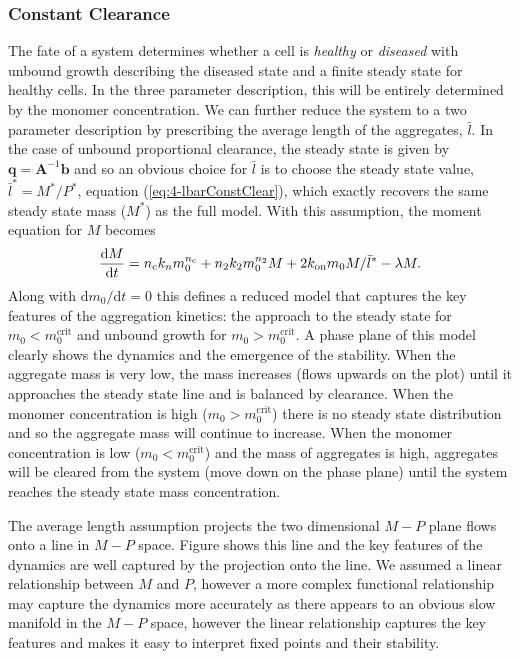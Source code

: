 \subsubsection{Constant Clearance}

The fate of a system determines whether a cell is \textit{healthy} or \textit{diseased} with unbound growth describing the diseased state and a finite steady state for healthy cells. In the three parameter description, this will be entirely determined by the monomer concentration. We can further reduce the system to a two parameter description by prescribing the average length of the aggregates, $\bar{l}$. In the case of unbound proportional clearance, the steady state is given by $\mathbf{q}=\mathbf{A}^{-1}\mathbf{b}$ and so an obvious choice for $\bar{l}$ is to choose the steady state value, $\bar{l}^*=M^*/P^*$, equation (\ref{eq:4-lbarConstClear}), which exactly recovers the same steady state mass ($M^*$) as the full model. With this assumption, the moment equation for $M$ becomes
\begin{equation}
    \frac{\text{d}M}{\text{d}t}= n_{\mathrm{c}} k_n m_0^{n_{\mathrm{c}}} + n_2 k_2 m_0^{n_2} M + 2 k_\text{on} m_0 M/\bar{l}^* - \lambda M.
    \label{eq:4-reducedConstClear}
\end{equation}
Along with $\text{d}m_0/\text{d}t=0$ this defines a reduced model that captures the key features of the aggregation kinetics: the approach to the steady state for $m_0 < m_0^{\text{crit}}$ and unbound growth for $m_0 > m_0^{\text{crit}}$. A phase plane of this model clearly shows the dynamics and the emergence of the stability. When the aggregate mass is very low, the mass increases (flows upwards on the plot) until it approaches the steady state line and is balanced by clearance. When the monomer concentration is high ($m_0>m_0^{\text{crit}}$) there is no steady state distribution and so the aggregate mass will continue to increase. When the monomer concentration is low ($m_0<m_0^{\text{crit}}$) and the mass of aggregates is high, aggregates will be cleared from the system (move down on the phase plane) until the system reaches the steady state mass concentration.

The average length assumption projects the two dimensional $M-P$ plane flows onto a line in $M-P$ space. Figure  shows this line and the key features of the dynamics are well captured by the projection onto the line. We assumed a linear relationship between $M$ and $P$, however a more complex functional relationship may capture the dynamics more accurately as there appears to an obvious slow manifold in the $M-P$ space, however the linear relationship captures the key features and makes it easy to interpret fixed points and their stability.

